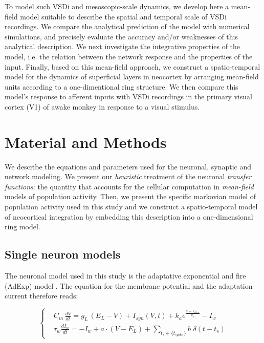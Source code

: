 \documentclass[8pt, colorlinks, a4paper]{article}
\newcommand{\corr}[1]{{#1}}
\begin{document}
\corr{To model such VSDi and mesoscopic-scale dynamics, we develop
  here a mean-field model suitable to describe the spatial and
  temporal scale of VSDi recordings.  We compare the analytical
  prediction of the model with numerical simulations, and precisely
  evaluate the accuracy and/or weaknesses of this analytical
  description. We next investigate the integrative properties of the
  model, i.e.  the relation between the network response and the
  properties of the input. Finally, based on this mean-field approach,
  we construct a spatio-temporal model for the dynamics of superficial
  layers in neocortex by arranging mean-field units according to a
  one-dimentional ring structure. We then compare this model's
  response to afferent inputs with VSDi recordings in the primary
  visual cortex (V1) of awake monkey in response to a visual
  stimulus.}


\section{Material and Methods}
\label{sec-3}
\small

We describe the equations and parameters used for the neuronal,
synaptic and network modeling. We present our \emph{heuristic}
treatment of the neuronal \emph{transfer functions}: the quantity that
accounts for the cellular computation in \emph{mean-field} models of
population activity. Then, we present the specific markovian model of
population activity used in this study \corr{and we construct a
  spatio-temporal model of neocortical integration by embedding this
  description into a one-dimensional ring model}.

\subsection{Single neuron models}
\label{sec-3-1}

The neuronal model used in this study is the adaptative exponential
and fire (AdExp) model \cite{Brette2005a}. The equation for the membrane
potential and the adaptation current therefore reads:

\begin{equation}
\label{eq:iAdExp}
  \left\{
  \begin{split}
  & C_m\,\frac{dV}{dt} = g_{L} \,(E_{L}-V) + I_{syn}(V,t) + k_a e^{\frac{V - V_{thre} }{k_a}}- I_w \\
  & \tau_w \frac{d I_w}{dt} = - I_w +  a \cdot (V-E_L) + \sum_{t_s \in \{t_{spike}\}} b \, \, \delta (t-t_s)
  \end{split}
\right.
\end{equation}
\end{document}
